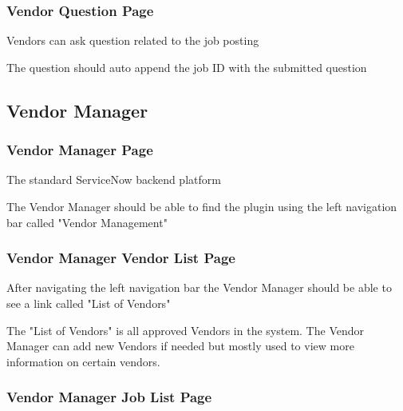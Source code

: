 \documentclass[10pt]{article}
\newcounter{subsubsubsection}[subsubsection]
\begin{document}
\subsubsection{Vendor Question Page}\label{sec:VendorQuestion}


Vendors can ask question related to the job posting


The question should auto append the job ID with the submitted question

\subsection{Vendor Manager}

\subsubsection{Vendor Manager Page}\label{sec:Manager}


The standard ServiceNow backend platform


The Vendor Manager should be able to find the plugin using the left navigation bar called "Vendor Management"

\subsubsection{Vendor Manager Vendor List Page}\label{sec:ManagerVendors}


After navigating the left navigation bar the Vendor Manager should be able to see a link called "List of Vendors"


The "List of Vendors" is all approved Vendors in the system. The Vendor Manager can add new Vendors if needed but mostly used to view more information on certain vendors. 

\subsubsection{Vendor Manager Job List Page}\label{sec:ManagerJobs}

\end{document}
